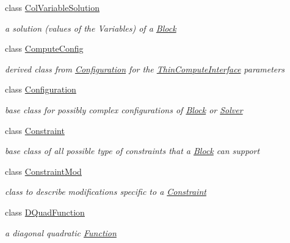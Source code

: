 \begin{DoxyCompactItemize}
class \mbox{\hyperlink{class_s_m_spp__di__unipi__it_1_1_col_variable_solution}{Col\+Variable\+Solution}}
\begin{DoxyCompactList}\small\item\em a solution (values of the Variables) of a \mbox{\hyperlink{class_s_m_spp__di__unipi__it_1_1_block}{Block}} \end{DoxyCompactList}\item 
class \mbox{\hyperlink{class_s_m_spp__di__unipi__it_1_1_compute_config}{Compute\+Config}}
\begin{DoxyCompactList}\small\item\em derived class from \mbox{\hyperlink{class_s_m_spp__di__unipi__it_1_1_configuration}{Configuration}} for the \mbox{\hyperlink{class_s_m_spp__di__unipi__it_1_1_thin_compute_interface}{Thin\+Compute\+Interface}} parameters \end{DoxyCompactList}\item 
class \mbox{\hyperlink{class_s_m_spp__di__unipi__it_1_1_configuration}{Configuration}}
\begin{DoxyCompactList}\small\item\em base class for possibly complex configurations of \mbox{\hyperlink{class_s_m_spp__di__unipi__it_1_1_block}{Block}} or \mbox{\hyperlink{class_s_m_spp__di__unipi__it_1_1_solver}{Solver}} \end{DoxyCompactList}\item 
class \mbox{\hyperlink{class_s_m_spp__di__unipi__it_1_1_constraint}{Constraint}}
\begin{DoxyCompactList}\small\item\em base class of all possible type of constraints that a \mbox{\hyperlink{class_s_m_spp__di__unipi__it_1_1_block}{Block}} can support \end{DoxyCompactList}\item 
class \mbox{\hyperlink{class_s_m_spp__di__unipi__it_1_1_constraint_mod}{Constraint\+Mod}}
\begin{DoxyCompactList}\small\item\em class to describe modifications specific to a \mbox{\hyperlink{class_s_m_spp__di__unipi__it_1_1_constraint}{Constraint}} \end{DoxyCompactList}\item 
class \mbox{\hyperlink{class_s_m_spp__di__unipi__it_1_1_d_quad_function}{D\+Quad\+Function}}
\begin{DoxyCompactList}\small\item\em a diagonal quadratic \mbox{\hyperlink{class_s_m_spp__di__unipi__it_1_1_function}{Function}} \end{DoxyCompactList}\item 

\end{DoxyCompactItemize}
